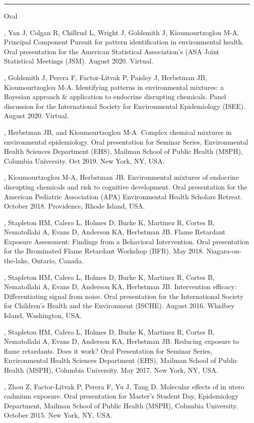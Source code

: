 \documentclass[a4paper,10pt]{article}
\newlength{\cvcolumngapwidth}
\newlength{\cvleftcolumnwidth}
\newlength{\cvrightcolumnwidth}
\newcommand{\cvsectionstyle}[1]{{\normalsize\cvsectionfont\textcolor{cvsectioncolor}{#1}}}
\newcommand{\cvdurationstyle}[1]{{\small\cvdurationfont\textcolor{cvdurationcolor}{#1}}}
\newlength{\cvafteritemskipamount}
\newlength{\cvaftersectionskipamount}
\newlength{\cvparskip}
\newcommand{\cvsection}[1]{
    \begin{minipage}[t]{\cvleftcolumnwidth}
        \raggedleft\cvsectionstyle{#1}
    \end{minipage}%
    \hspace{\cvcolumngapwidth}%
    \begin{minipage}[t]{\cvrightcolumnwidth}
        \textcolor{cvrulecolor}{\rule{\cvrightcolumnwidth}{0.3mm}}
    \end{minipage}

    \vspace{\cvaftersectionskipamount}
}
\newcommand{\cvitem}[2]{
    \begin{minipage}[t]{\cvleftcolumnwidth}
        \raggedleft #1
    \end{minipage}%
    \hspace{\cvcolumngapwidth}%
    \begin{minipage}[t]{\cvrightcolumnwidth}
        \setlength{\parskip}{\cvparskip} #2
    \end{minipage}

    \vspace{\cvafteritemskipamount}
}
\begin{document}
\clearpage
\cvsection{PRESENTATIONS}
\cvitem{
    \cvdurationstyle{Oral}
}{  
    \begin{etaremune}
     \setcounter{enumi}{9}
     	\item {\cvnamefont{Gibson EA}}, Yan J, Colgan R, Chillrud L, Wright J, Goldsmith J, Kioumourtzoglou M-A. Principal Component Pursuit for pattern identification in environmental health. Oral presentation for the American Statistical Association’s (ASA Joint Statistical Meetings (JSM). August 2020. Virtual.
	\item {\cvnamefont{Gibson EA}}, Goldsmith J, Perera F, Factor-Litvak P, Paisley J, Herbstman JB, Kioumourtzoglou M-A. Identifying patterns in environmental mixtures: a Bayesian approach \& application to endocrine disrupting chemicals. Panel discussion for the International Society for Environmental Epidemiology (ISEE). August 2020. Virtual. 
     	\item {\cvnamefont{Gibson EA}}, Herbstman JB, and Kioumourtzoglou M-A. Complex chemical mixtures in environmental epidemiology. Oral presentation for Seminar Series, Environmental Health Sciences Department (EHS), Mailman School of Public Health (MSPH), Columbia University. Oct 2019. New York, NY, USA.
	\item {\cvnamefont{Gibson EA}}, Kioumourtzoglou M-A, Herbstman JB. Environmental mixtures of endocrine disrupting chemicals and risk to cognitive development. Oral presentation for the American Pediatric Association (APA) Environmental Health Scholars Retreat. October 2018. Providence, Rhode Island, USA.
	\item {\cvnamefont{Gibson EA}}, Stapleton HM, Calero L, Holmes D, Burke K, Martinez R, Cortes B, Nematollahi A, Evans D, Anderson KA, Herbstman JB. Flame Retardant Exposure Assessment: Findings from a Behavioral Intervention. Oral presentation for the Brominated Flame Retardant Workshop (BFR). May 2018. Niagara-on-the-lake, Ontario, Canada. 
    	\item {\cvnamefont{Gibson EA}}, Stapleton HM, Calero L, Holmes D, Burke K, Martinez R, Cortes B, Nematollahi A, Evans D, Anderson KA, Herbstman JB. Intervention efficacy: Differentiating signal from noise. Oral presentation for the International Society for Children’s Health and the Environment (ISCHE). August 2016. Whidbey Island, Washington, USA.
	\item {\cvnamefont{Gibson EA}}, Stapleton HM, Calero L, Holmes D, Burke K, Martinez R, Cortes B, Nematollahi A, Evans D, Anderson KA, Herbstman JB. Reducing exposure to flame retardants. Does it work? Oral Presentation for Seminar Series, Environmental Health Sciences Department (EHS), Mailman School of Public Health (MSPH), Columbia University. May 2017. New York, NY, USA.
	\item {\cvnamefont{Gibson EA}}, Zhou Z, Factor-Litvak P, Perera F, Yu J, Tang D. Molecular effects of in utero cadmium exposure. Oral presentation for Master’s Student Day, Epidemiology Department, Mailman School of Public Health (MSPH), Columbia University. October 2015. New York, NY, USA.  
\end{etaremune}
}
\end{document}
